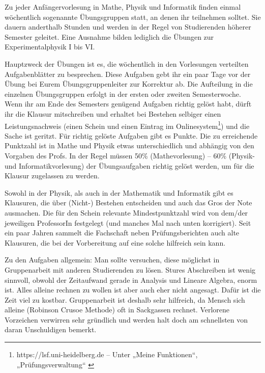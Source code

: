 Zu jeder Anfängervorlesung in Mathe, Physik und Informatik finden einmal
wöchentlich sogenannte Übungsgruppen statt, an denen ihr teilnehmen
solltet. Sie dauern anderthalb Stunden und werden in der Regel von
Studierenden höherer Semester geleitet. Eine Ausnahme bilden
lediglich die Übungen zur Experimentalphysik I bis VI.

Hauptzweck der Übungen ist es, die wöchentlich in den Vorlesungen
verteilten Aufgabenblätter zu besprechen. Diese Aufgaben gebt ihr ein
paar Tage vor der Übung bei Eurem Übungsgruppenleiter zur Korrektur
ab. Die Aufteilung in die einzelnen Übungsgruppen erfolgt in der
ersten oder zweiten Semesterwoche. Wenn ihr am Ende des Semesters
genügend Aufgaben richtig gelöst habt, dürft ihr die Klausur
mitschreiben und erhaltet bei Bestehen selbiger einen Leistungsnachweis (einen Schein und einen Eintrag im Onlinesystem\footnote{https://lsf.uni-heidelberg.de -- Unter „Meine Funktionen“, „Prüfungsverwaltung“ \label{fn:hispos}}) und die Sache ist geritzt.  Für richtig gelöste
Aufgaben gibt es Punkte. Die zu erreichende Punktzahl ist in Mathe und
Physik etwas unterschiedlich und abhängig von den Vorgaben des
Profs. In der Regel müssen 50\% (Mathevorlesung) -- 60\%
(Physik- und Informatikvorlesung) der Übungsaufgaben richtig gelöst werden, um für
die Klausur zugelassen zu werden.

Sowohl in der Physik, als auch in der Mathematik und Informatik gibt es Klausuren, die
über (Nicht-) Bestehen entscheiden und auch das Gros der Note ausmachen.
Die für den Schein relevante
Mindestpunktzahl wird von dem/der jeweiligen ProfessorIn festgelegt (und
manches Mal nach unten korrigiert). Seit ein paar Jahren sammelt die
Fachschaft neben Prüfungsberichten auch alte Klausuren, die bei der
Vorbereitung auf eine solche hilfreich sein kann.

Zu den Aufgaben allgemein: Man sollte versuchen, diese möglichst in
Gruppenarbeit mit anderen Studierenden zu lösen. Stures Abschreiben
ist wenig sinnvoll, obwohl der Zeitaufwand gerade in Analysis und Lineare Algebra, enorm ist. Alles alleine
rechnen zu wollen ist aber auch eher nicht angesagt. Dafür ist
die Zeit viel zu kostbar. Gruppenarbeit ist deshalb sehr hilfreich, da
Mensch sich alleine (Robinson Crusoe Methode) oft in Sackgassen
rechnet. Verlorene Vorzeichen verwirren sehr gründlich und werden
halt doch am schnellsten von daran Unschuldigen bemerkt.


